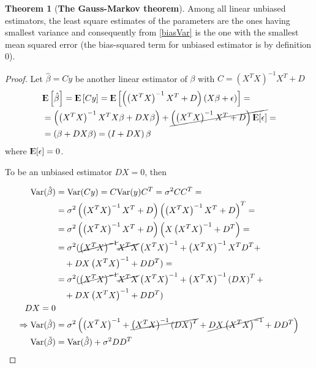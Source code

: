 \documentclass[12pt, letterpaper]{article}
\theoremstyle{definition}
\newcommand{\E}{{\rm I\kern-.3em E}}
\newcommand{\Var}{\mathrm{Var}}
\newtheorem{theorem}{Theorem}
\begin{document}
\begin{theorem}[\textbf{The Gauss-Markov theorem}]
Among all linear unbiased estimators, the least square estimates of the parameters are the ones having smallest variance and consequently from \autoref{biasVar} is the one with the smallest mean squared error (the bias-squared term for unbiased estimator is by definition $0$).
\begin{proof}
Let $\hat{\beta} = Cy$ be another linear estimator of $\beta$ with $C = (X^TX)^{-1}X^T+D$
\begin{align}
&\E\left[ \hat{\beta} \right] = \E\left[ Cy \right] = \E\left[\left(\left(X^TX\right)^{-1}X^T+D\right) \left( X\beta+\epsilon\right)\right] =\\
& = \left(\left(X^TX\right)^{-1}X^T X\beta +DX\beta\right) +\cancel{\left(\left(X^TX\right)^{-1}X^T  +D\right) \E[\epsilon]}=\\
& = \left(\beta +DX\beta\right) = \left( I +DX\right) \beta\\
\end{align}
where $ \E[\epsilon] = 0$.

To be an unbiased estimator $DX = 0$, then

\begin{equation}
\begin{aligned}
\Var(\hat{\beta}) &= \Var(Cy) = C\Var(y) C^T = \sigma^2 CC^T = \\
&= \sigma^2 \left( \left(X^T X\right)^{-1}X^T +D \right)    \left( \left(X^T X\right)^{-1}X^T+D\right)^T =\\
&= \sigma^2 \left( \left(X^T X\right)^{-1}X^T +D \right)    \left( X \left(X^TX\right)^{-1} + D^T \right)  =\\
&= \sigma^2 (  \cancel{\left(X^TX\right)^{-1}}\cancel{X^T X}   \left(X^TX\right)^{-1} +  \left(X^T X\right)^{-1}X^TD^T                          +\\
&\quad + D X \left(X^TX\right)^{-1} +DD^T) =\\
&= \sigma^2 (  \cancel{\left(X^TX\right)^{-1}}\cancel{X^T X}   \left(X^TX\right)^{-1} +  \left(X^T X\right)^{-1}\left( DX \right)^T                          +\\
&\quad + D X \left(X^TX\right)^{-1} +DD^T) \\
DX=0 \\\Rightarrow \Var(\tilde{\beta}) &= \sigma^2 \left( \left(X^TX\right)^{-1} +  \cancel{\left(X^T X\right)^{-1}\left( DX \right)^T }  + \cancel{D X \left(X^TX\right)^{-1} }+DD^T\right) \\
\Var(\tilde{\beta}) &= \Var(\hat{\beta})  + \sigma^2DD^T
\end{aligned}
\end{equation}

\end{proof}
\end{theorem}
\end{document}
